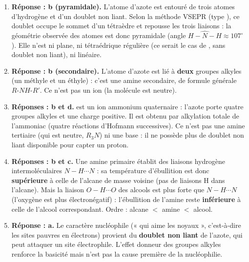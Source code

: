 \documentclass[11pt]{article}
\newcommand{\cle}[1]{{\popxbold\color{popdark}#1}}
\begin{document}
\begin{corrige}
\begin{enumerate}
\item \textbf{Réponse : b (pyramidale).} L'atome d'azote est entouré de trois atomes d'hydrogène et d'un doublet non liant. Selon la méthode VSEPR (type ), ce doublet occupe le sommet d'un tétraèdre et repousse les trois liaisons  : la géométrie observée des atomes est donc \cle{pyramidale} (angle $\widehat{H-N-H} \approx 107^{\circ}$). Elle n'est ni plane, ni tétraédrique régulière (ce serait le cas de , sans doublet non liant), ni linéaire.
\item \textbf{Réponse : b (secondaire).} L'atome d'azote est lié à \textbf{deux} groupes alkyles (un méthyle et un éthyle) : c'est une amine \cle{secondaire}, de formule générale $R\text{-}NH\text{-}R'$. Ce n'est pas un ion (la molécule est neutre).
\item \textbf{Réponses : b et d.}  est un ion \cle{ammonium quaternaire} : l'azote porte quatre groupes alkyles et une charge positive. Il est obtenu par alkylation totale de l'ammoniac (quatre réactions d'Hofmann successives). Ce n'est pas une amine tertiaire (qui est neutre, $R_3N$) ni une base : il ne possède plus de doublet non liant disponible pour capter un proton.
\item \textbf{Réponses : b et c.} Une amine primaire établit des liaisons hydrogène intermoléculaires $N-H\cdots N$ : sa température d'ébullition est donc \textbf{supérieure} à celle de l'alcane de masse voisine (pas de liaisons H dans l'alcane). Mais la liaison $O-H\cdots O$ des alcools est plus forte que $N-H\cdots N$ (l'oxygène est plus électronégatif) : l'ébullition de l'amine reste \textbf{inférieure} à celle de l'alcool correspondant. Ordre : alcane $<$ amine $<$ alcool.
\item \textbf{Réponse : a.} Le caractère \cle{nucléophile} (« qui aime les noyaux », c'est-à-dire les sites pauvres en électrons) provient du \textbf{doublet non liant} de l'azote, qui peut attaquer un site électrophile. L'effet donneur des groupes alkyles renforce la basicité mais n'est pas la cause première de la nucléophilie.
\end{enumerate}
\end{corrige}
\end{document}
